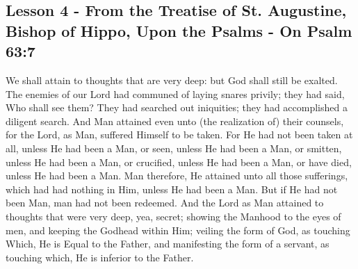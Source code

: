 \subsection{Lesson 4 - From the Treatise of St. Augustine, Bishop of Hippo, Upon the Psalms - On Psalm 63:7}
\begin{Parallel}[v]{\colw}{\colx}
{}
{\vern
{\noindent
We shall attain to thoughts that are very deep: but God shall still be exalted. The enemies of our Lord had communed of laying snares privily; they had said, Who shall see them? They had searched out iniquities; they had accomplished a diligent search. And Man attained even unto (the realization of) their counsels, for the Lord, as Man, suffered Himself to be taken. For He had not been taken at all, unless He had been a Man, or seen, unless He had been a Man, or smitten, unless He had been a Man, or crucified, unless He had been a Man, or have died, unless He had been a Man. Man therefore, He attained unto all those sufferings, which had had nothing in Him, unless He had been a Man. But if He had not been Man, man had not been redeemed. And the Lord as Man attained to thoughts that were very deep, yea, secret; showing the Manhood to the eyes of men, and keeping the Godhead within Him; veiling the form of God, as touching Which, He is Equal to the Father, and manifesting the form of a servant, as touching which, He is inferior to the Father.\\
}}
\end{Parallel}
